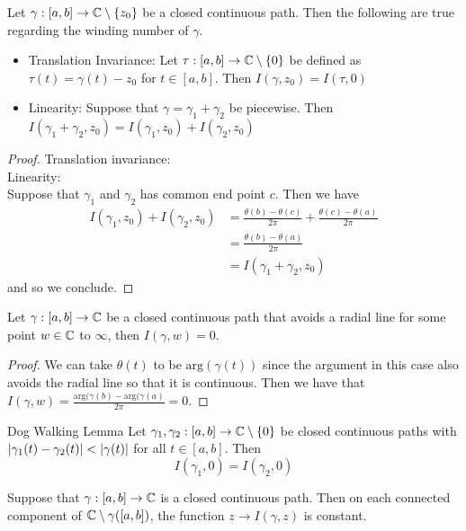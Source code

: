 \documentclass[a4paper]{article}
\begin{document}
\begin{prp}{}{} Let $\gamma:[a,b]\to\mathbb{C}\setminus\{z_0\}$ be a closed continuous path. Then the following are true regarding the winding number of $\gamma$. 
\begin{itemize}
\item Translation Invariance: Let $\tau:[a,b]\to\mathbb{C}\setminus\{0\}$ be defined as $\tau(t)=\gamma(t)-z_0$ for $t\in[a,b]$. Then $I(\gamma,z_0)=I(\tau,0)$
\item Linearity: Suppose that $\gamma=\gamma_1+\gamma_2$ be piecewise. Then $I(\gamma_1+\gamma_2,z_0)=I(\gamma_1,z_0)+I(\gamma_2,z_0)$
\end{itemize}\tcbline
\begin{proof}
Translation invariance: \\
Linearity: \\
Suppose that $\gamma_1$ and $\gamma_2$ has common end point $c$. Then we have
\begin{align*}
I(\gamma_1,z_0)+I(\gamma_2,z_0)&=\frac{\theta(b)-\theta(c)}{2\pi}+\frac{\theta(c)-\theta(a)}{2\pi}\\
&=\frac{\theta(b)-\theta(a)}{2\pi}\\
&=I(\gamma_1+\gamma_2,z_0)
\end{align*}
and so we conclude. 
\end{proof}
\end{prp}

\begin{lmm}{}{} Let $\gamma:[a,b]\to\mathbb{C}$ be a closed continuous path that avoids a radial line for some point $w\in\mathbb{C}$ to $\infty$, then $I(\gamma,w)=0$. \tcbline
\begin{proof}
We can take $\theta(t)$ to be $\text{arg}(\gamma(t))$ since the argument in this case also avoids the radial line so that it is continuous. Then we have that $I(\gamma,w)=\frac{\text{arg}(\gamma(b)-\text{arg}(\gamma(a)}{2\pi }=0$. 
\end{proof}
\end{lmm}

\begin{lmm}{Dog Walking Lemma}{} Let $\gamma_1,\gamma_2:[a,b]\to\mathbb{C}\setminus\{0\}$ be closed continuous paths with $\abs{\gamma_1(t)-\gamma_2(t)}<\abs{\gamma(t)}$ for all $t\in[a,b]$. Then $$I(\gamma_1,0)=I(\gamma_2,0)$$
\end{lmm}

\begin{lmm}{}{} Suppose that $\gamma:[a,b]\to\mathbb{C}$ is a closed continuous path. Then on each connected component of $\mathbb{C}\setminus\gamma([a,b])$, the function $z\to I(\gamma,z)$ is constant. 
\end{lmm}
\end{document}
